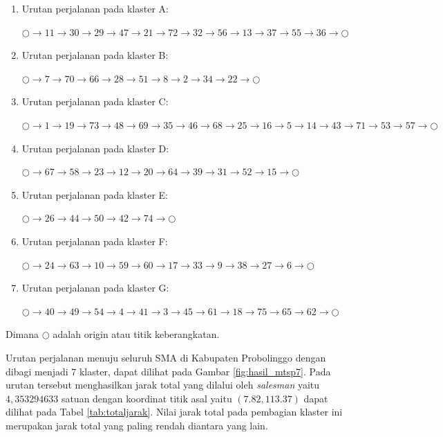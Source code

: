 \begin{enumerate}

\item Urutan perjalanan pada klaster A:

$\bigcirc \to 11 \to 30 \to 29 \to 47 \to 21 \to 72 \to 32 \to 56 \to 13 \to 37 \to 55 \to 36 \to \bigcirc$

\item Urutan perjalanan pada klaster B:

$\bigcirc \to 7 \to 70 \to 66 \to 28 \to 51 \to 8 \to 2 \to 34 \to 22 \to \bigcirc$

\item Urutan perjalanan pada klaster C:

$\bigcirc \to 1 \to 19 \to 73 \to 48 \to 69 \to 35 \to 46 \to 68 \to 25 \to 16 \to 5 \to 14 \to 43 \to 71 \to 53 \to 57 \to \bigcirc$

\item Urutan perjalanan pada klaster D:

$\bigcirc \to 67 \to 58 \to 23 \to 12 \to 20 \to 64 \to 39 \to 31 \to 52 \to 15 \to \bigcirc$

\item Urutan perjalanan pada klaster E:

$\bigcirc \to 26 \to 44 \to 50 \to 42 \to 74 \to \bigcirc$

\item Urutan perjalanan pada klaster F:

$\bigcirc \to 24 \to 63 \to 10 \to 59 \to 60 \to 17 \to 33 \to 9 \to 38 \to 27 \to 6 \to \bigcirc$

\item Urutan perjalanan pada klaster G:

$\bigcirc \to 40 \to 49 \to 54 \to 4 \to 41 \to 3 \to 45 \to 61 \to 18 \to 75 \to 65 \to 62 \to \bigcirc$

\end{enumerate}

\noindent Dimana $\bigcirc$ adalah origin atau titik keberangkatan.

Urutan perjalanan menuju seluruh SMA di Kabupaten Probolinggo dengan dibagi menjadi 7 klaster, dapat dilihat pada Gambar \ref{fig:hasil_mtsp7}. Pada urutan tersebut menghasilkan jarak total yang dilalui oleh \textit{salesman} yaitu $4,353294633$ satuan dengan koordinat titik asal yaitu $(7.82, 113.37)$ dapat dilihat pada Tabel \ref{tab:totaljarak}. Nilai jarak total pada pembagian klaster ini merupakan jarak total yang paling rendah diantara yang lain.

